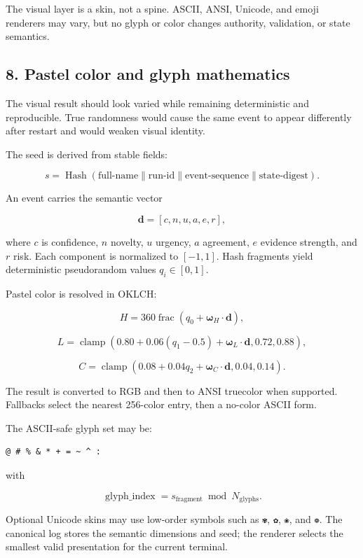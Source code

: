 The visual layer is a skin, not a spine. ASCII, ANSI, Unicode, and emoji
renderers may vary, but no glyph or color changes authority, validation, or
state semantics.

\subsection{8. Pastel color and glyph mathematics}

The visual result should look varied while remaining deterministic and
reproducible. True randomness would cause the same event to appear differently
after restart and would weaken visual identity.

The seed is derived from stable fields:

\[
s=\operatorname{Hash}(
\text{full-name}\parallel
\text{run-id}\parallel
\text{event-sequence}\parallel
\text{state-digest}).
\]

An event carries the semantic vector

\[
\mathbf d=[c,n,u,a,e,r],
\]

where \(c\) is confidence, \(n\) novelty, \(u\) urgency, \(a\) agreement, \(e\)
evidence strength, and \(r\) risk. Each component is normalized to
\([-1,1]\). Hash fragments yield deterministic pseudorandom values
\(q_i\in[0,1]\).

Pastel color is resolved in OKLCH:

\[
H=360\operatorname{frac}
\left(q_0+\boldsymbol{\omega}_H\cdot\mathbf d\right),
\]

\[
L=\operatorname{clamp}
\left(
0.80+0.06(q_1-0.5)+
\boldsymbol{\omega}_L\cdot\mathbf d,
0.72,
0.88
\right),
\]

\[
C=\operatorname{clamp}
\left(
0.08+0.04q_2+
\boldsymbol{\omega}_C\cdot\mathbf d,
0.04,
0.14
\right).
\]

The result is converted to RGB and then to ANSI truecolor when supported.
Fallbacks select the nearest 256-color entry, then a no-color ASCII form.

The ASCII-safe glyph set may be:

\begin{verbatim}
@ # % & * + = ~ ^ :
\end{verbatim}

with

\[
\operatorname{glyph\_index}
=
s_{\text{fragment}}\bmod N_{\text{glyphs}}.
\]

Optional Unicode skins may use low-order symbols such as \texttt{✾}, \texttt{✿}, \texttt{❀}, and
\texttt{❁}. The canonical log stores the semantic dimensions and seed; the renderer
selects the smallest valid presentation for the current terminal.


